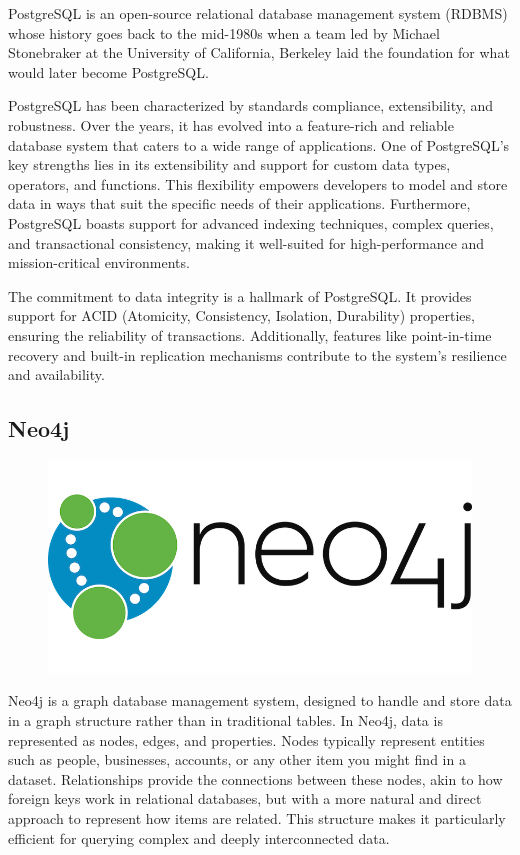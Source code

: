 PostgreSQL is an open-source relational database management system (RDBMS) whose history goes back to the mid-1980s when a team led by Michael Stonebraker at the University of California, Berkeley laid the foundation for what would later become PostgreSQL.

PostgreSQL has been characterized by standards compliance, extensibility, and robustness. Over the years, it has evolved into a feature-rich and reliable database system that caters to a wide range of applications. One of PostgreSQL's key strengths lies in its extensibility and support for custom data types, operators, and functions. This flexibility empowers developers to model and store data in ways that suit the specific needs of their applications. Furthermore, PostgreSQL boasts support for advanced indexing techniques, complex queries, and transactional consistency, making it well-suited for high-performance and mission-critical environments.

The commitment to data integrity is a hallmark of PostgreSQL. It provides support for ACID (Atomicity, Consistency, Isolation, Durability) properties, ensuring the reliability of transactions. Additionally, features like point-in-time recovery and built-in replication mechanisms contribute to the system's resilience and availability.

\subsection*{Neo4j}

\begin{figure}
\begin{center}
\includegraphics[height=.5in]{neo4jlogo.png}
\end{center}
\end{figure}

Neo4j is a graph database management system, designed to handle and store data in a graph structure rather than in traditional tables. In Neo4j, data is represented as nodes, edges, and properties. Nodes typically represent entities such as people, businesses, accounts, or any other item you might find in a dataset. Relationships provide the connections between these nodes, akin to how foreign keys work in relational databases, but with a more natural and direct approach to represent how items are related. This structure makes it particularly efficient for querying complex and deeply interconnected data.

